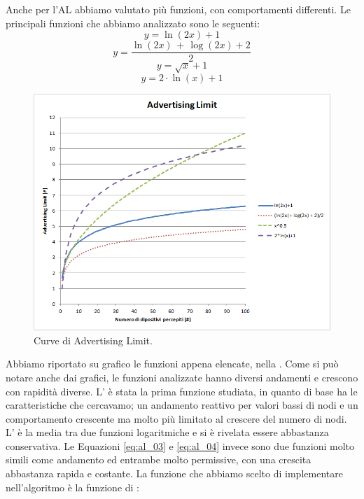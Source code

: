 Anche per l'\acs{AL} abbiamo valutato più funzioni, con comportamenti differenti. Le principali funzioni che abbiamo analizzato sono le seguenti:
\begin{equation}
	\label{eq:al_01}
	y=\ln \left( 2\textit{x}\right) + 1
\end{equation}
\begin{equation}
	\label{eq:al_02}
	y=\dfrac{\ln \left( 2\textit{x}\right) \, + \, \log\left( 2\textit{x}\right) + 2}{2}
\end{equation}
\begin{equation}
	\label{eq:al_03}
	y=\sqrt{\textit{x}} + 1
\end{equation}
\begin{equation}
	\label{eq:al_04}
	y=2\cdot\ln\left( \textit{x}\right)  + 1
\end{equation}
\begin{figure}[t]
	\centering
	\includegraphics[width=0.9\linewidth]{Images/grafici_usati/AL_curve_no_arr}
	\caption[Curve dell'AL (continuo)]{Curve di Advertising Limit.}
	\label{fig:AL_curve_no_arr}
\end{figure}
Abbiamo riportato su grafico le funzioni appena elencate, nella . Come si può notare anche dai grafici, le funzioni analizzate hanno diversi andamenti e crescono con rapidità diverse. L' è stata la prima funzione studiata, in quanto di base ha le caratteristiche che cercavamo; un andamento reattivo per valori bassi di nodi e un comportamento crescente ma molto più limitato al crescere del numero di nodi. L' è la media tra due funzioni logaritmiche e si è rivelata essere abbastanza conservativa. Le Equazioni \eqref{eq:al_03} e \eqref{eq:al_04} invece sono due funzioni molto simili come andamento ed entrambe molto permissive, con una crescita abbastanza rapida e costante. La funzione che abbiamo scelto di implementare nell'algoritmo è la funzione di :

